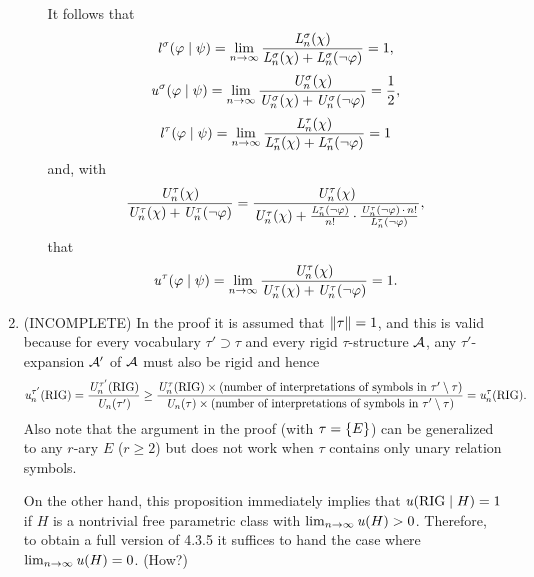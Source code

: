 \begin{enumerate}[1.]
\begin{enumerate}[(1)]
It follows that
\[
\lprob^\sigma(\varphi \wrt \psi) = \lim_{n \to \infty} \frac{\lclass{n}^\sigma(\chi)}{\lclass{n}^\sigma(\chi) + \lclass{n}^\sigma(\neg\varphi)} = 1,
\]
\[
\uprob^\sigma(\varphi \wrt \psi) = \lim_{n \to \infty} \frac{\uclass{n}^\sigma(\chi)}{\uclass{n}^\sigma(\chi) + \uclass{n}^\sigma(\neg\varphi)} = \frac{1}{2},
\]
\[
\lprob^\tau(\varphi \wrt \psi) = \lim_{n \to \infty} \frac{\lclass{n}^\tau(\chi)}{\lclass{n}^\tau(\chi) + \lclass{n}^\tau(\neg\varphi)} = 1
\]
and, with
\[
\frac{\mathit{U}_{n}^\tau(\chi)}{\mathit{U}_{n}^\tau(\chi) + \mathit{U}_{n}^\tau(\neg\varphi)} = \frac{\mathit{U}_{n}^\tau(\chi)}{\mathit{U}_{n}^\tau(\chi) + \frac{\mathit{L}_{n}^\tau(\neg\varphi)}{n!} \mathop{\cdot} \frac{\mathit{U}_{n}^\tau(\neg\varphi) \mathop{\cdot} n!}{\mathit{L}_{n}^\tau(\neg\varphi)}},
\]
that
\[
\uprob^\tau(\varphi \wrt \psi) = \lim_{n \to \infty} \frac{\uclass{n}^\tau(\chi)}{\uclass{n}^\tau(\chi) + \uclass{n}^\tau(\neg\varphi)} = 1.
\]
\end{enumerate}
%
\item {} (INCOMPLETE) In the proof it is assumed that $\|\tau\| = 1$, and this is valid because for every vocabulary $\tau' \supset \tau$ and every rigid $\tau$-structure $\mathcal{A}$, any $\tau'$-expansion $\mathcal{A}'$ of $\mathcal{A}$ must also be rigid and hence
\[
\uprob[n]^{\tau'}(\rigid) = \frac{\uclass{n}^{\tau'}(\rigid)}{\uclass{n}(\tau')} \geq \frac{\uclass{n}^\tau(\rigid) \times \text{(number of interpretations of symbols in \mathmode{\tau' \setminus \tau})}}{\uclass{n}(\tau) \times \text{(number of interpretations of symbols in \mathmode{\tau' \setminus \tau})}} = \uprob[n]^{\tau}(\rigid).
\]
Also note that the argument in the proof (with $\tau = {\{E\}}$) can be generalized to any $r$-ary $E$ ($r \geq 2$) but does not work when $\tau$ contains only unary relation symbols.

On the other hand, this proposition immediately implies that $\uprob(\rigid \wrt H) = 1$ if $H$ is a nontrivial free parametric class with $\lim_{n \to \infty} \uprob(H) > 0$. Therefore, to obtain a full version of 4.3.5 it suffices to hand the case where $\lim_{n \to \infty} \uprob(H) = 0$. (How?)
%
\end{enumerate}


\setcounter{section}{4}

